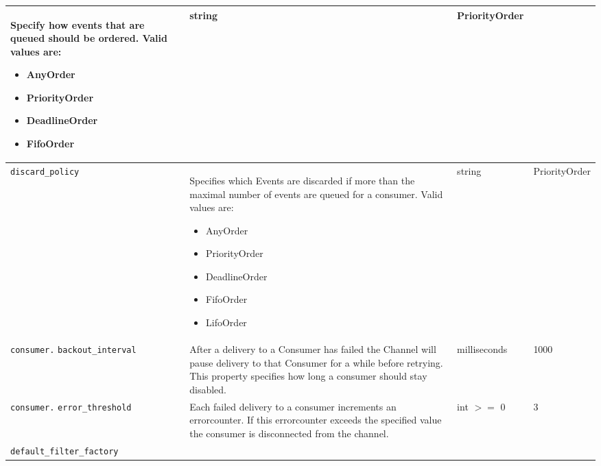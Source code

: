\begin{small}
\begin{longtable}{|p{5cm}|p{7.5cm}|p{1.5cm}|p{1.5cm}|}
    Specify how events that are queued should be ordered. Valid values
    are:
    \begin{itemize}
    \item AnyOrder

    \item PriorityOrder

    \item DeadlineOrder

    \item FifoOrder
    \end{itemize} &

    string & Priority\-Order \\ \hline

    \verb"discard_policy" &

    Specifies which Events are discarded if more than the
    maximal number of events are queued for a consumer.
    Valid values are:
    \begin{itemize}
    \item AnyOrder

    \item PriorityOrder

    \item DeadlineOrder

    \item FifoOrder

    \item LifoOrder
    \end{itemize} &

    string & Priority\-Order \\ \hline

    \verb"consumer."
    \verb"backout_interval" &

    After a delivery to a Consumer has failed the Channel will pause
    delivery to that Consumer for a while before retrying. This property
    specifies how long a consumer should stay disabled. &

    milli\-seconds & 1000 \\ \hline

    \verb"consumer."
    \verb"error_threshold" &

    Each failed delivery to a consumer increments an errorcounter. If this
    errorcounter exceeds the specified value the consumer is
    disconnected from the channel. &

    int $>=$ 0 & 3 \\ \hline

    \verb"default_filter_factory" &


\end{longtable}
\end{small}
